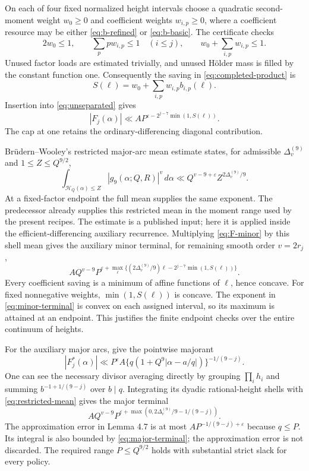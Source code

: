 \documentclass[11pt,letterpaper]{article}
\numberwithin{equation}{section}
\begin{document}
On each of four fixed normalized height intervals choose a quadratic
second-moment weight $w_0\ge0$ and coefficient weights $w_{i,p}\ge0$,
where a coefficient resource may be either
\eqref{eq:b-refined} or \eqref{eq:b-basic}.  The certificate checks
\[
 2w_0\le1,\qquad \sum_p p w_{i,p}\le1\quad(i\le j),
 \qquad w_0+\sum_{i,p}w_{i,p}\le1.
\]
Unused factor loads are estimated trivially, and unused H\"older mass
is filled by the constant function one.  Consequently the saving in
\eqref{eq:completed-product} is
\[
                 S(\ell)=w_0+\sum_{i,p}w_{i,p}b_{i,p}(\ell).
\]
Insertion into \eqref{eq:unseparated} gives
\begin{equation}
 |F_j(\alpha)|\ll A P^{\varepsilon-
                         2^{j-7}\min(1,S(\ell))}.
 \label{eq:F-minor}
\end{equation}
The cap at one retains the ordinary-differencing diagonal contribution.

Br\"udern--Wooley's restricted major-arc mean estimate
\cite[Theorem 4.2]{BW23} states, for admissible $\Delta_v^{(9)}$ and
$1\le Z\le Q^{9/2}$,
\begin{equation}
 \int_{\mathcal H_Q(\alpha)\le Z}|g_9(\alpha;Q,R)|^v\,d\alpha
          \ll Q^{v-9+\varepsilon}Z^{2\Delta_v^{(9)}/9}.
 \label{eq:restricted-mean}
\end{equation}
At a fixed-factor endpoint the full mean supplies the same exponent.
The predecessor \cite[Lemma~2.3]{BW22PN} already supplies this restricted
mean in the moment range used by the present recipes. The estimate is a
published input; here it is applied inside the efficient-differencing
auxiliary recurrence.
Multiplying \eqref{eq:F-minor} by this shell mean gives the auxiliary
minor terminal, for remaining smooth order $v=2r_j$,
\begin{equation}
 A Q^{v-9}P^{\varepsilon+
  \max_\ell\{(2\Delta_v^{(9)}/9)\ell
                        -2^{j-7}\min(1,S(\ell))\}}.
 \label{eq:minor-terminal}
\end{equation}
Every coefficient saving is a minimum of affine functions of $\ell$,
hence concave.  For fixed nonnegative weights,
$\min(1,S(\ell))$ is concave.  The exponent in
\eqref{eq:minor-terminal} is convex on each assigned interval, so its
maximum is attained at an endpoint.  This justifies the finite endpoint
checks over the entire continuum of heights.

For the auxiliary major arcs, \cite[Lemmas 4.7--4.8, (4.25)--(4.26)]{VW95}
give the pointwise majorant
\[
 |F_j^*(\alpha)|\ll P^\varepsilon A
      \{q(1+Q^9|\alpha-a/q|)\}^{-1/(9-j)}.
\]
One can see the necessary divisor averaging directly by grouping
$\prod_i h_i$ and summing $b^{-1+1/(9-j)}$ over $b\mid q$.
Integrating its dyadic rational-height shells with
\eqref{eq:restricted-mean} gives the major terminal
\begin{equation}
 A Q^{v-9}P^{\varepsilon+
             \max(0,2\Delta_v^{(9)}/9-1/(9-j))}.
 \label{eq:major-terminal}
\end{equation}
The approximation error in Lemma 4.7 is at most
$A P^{-1/(9-j)+\varepsilon}$ because $q\le P$.
Its integral is also bounded by \eqref{eq:major-terminal}; the
approximation error is not discarded.  The required range $P\le Q^{9/2}$
holds with substantial strict slack for every policy.
\end{document}
